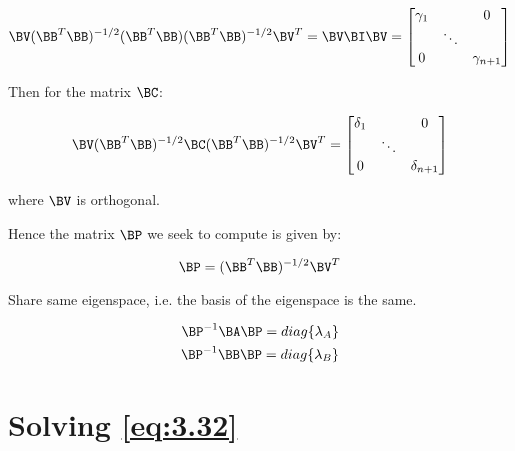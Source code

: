 \begin{equation} \label{eq:A.10}
\BV(\BB^{T}\BB)^{-1/2}(\BB^{T}\BB)(\BB^{T}\BB)^{-1/2}\BV^{T} = \BV\BI\BV = \begin{bmatrix}
\gamma_1 & & 0 \\
 & \ddots & \\
0 & & \gamma_{n+1}
\end{bmatrix}
\end{equation}

Then for the matrix $\BC$:

\begin{equation} \label{eq:A.11}
\BV(\BB^{T}\BB)^{-1/2}\BC(\BB^{T}\BB)^{-1/2}\BV^{T} = \begin{bmatrix}
\delta_1 & & 0 \\
 & \ddots & \\
0 & & \delta_{n+1}
\end{bmatrix}
\end{equation}

where $\BV$ is orthogonal.

Hence the matrix $\BP$ we seek to compute is given by:

\begin{equation} \label{eq:A.12}
\BP = (\BB^T\BB)^{-1/2}\BV^T
\end{equation}

Share same eigenspace, i.e. the basis of the eigenspace is the same.

\begin{eqnarray}
\BP^{-1}\BA\BP = diag\{\lambda_A\} \\
\nonumber
\BP^{-1}\BB\BP = diag\{\lambda_B\}
\end{eqnarray}


%

\section{Solving \ref{eq:3.32}}

